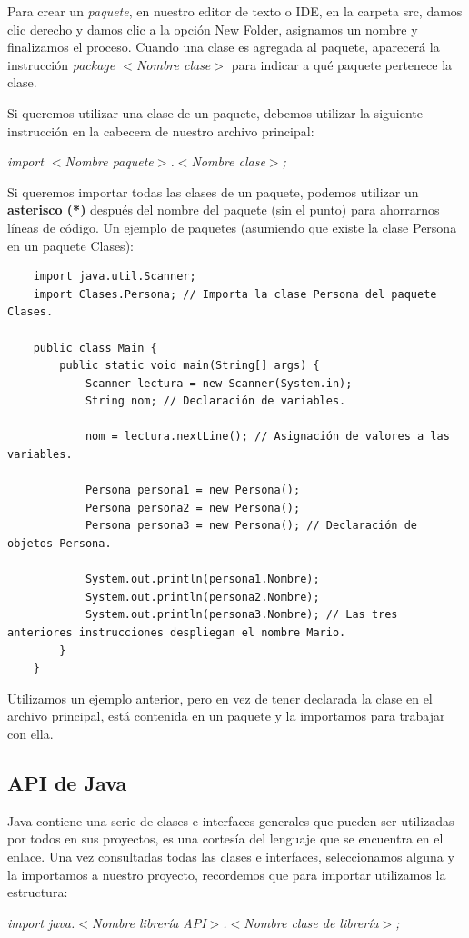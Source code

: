 Para crear un \textit{paquete}, en nuestro editor de texto o IDE, en la carpeta src, damos clic derecho y damos clic a la opción New Folder, asignamos un nombre y finalizamos el proceso. Cuando una clase es agregada al paquete, aparecerá la instrucción \textit{package $<$Nombre clase$>$} para indicar a qué paquete pertenece la clase.

Si queremos utilizar una clase de un paquete, debemos utilizar la siguiente instrucción en la cabecera de nuestro archivo principal:
\begin{center}
	\textit{import $<$Nombre paquete$>$.$<$Nombre clase$>$;}
\end{center}

Si queremos importar todas las clases de un paquete, podemos utilizar un \textbf{asterisco (*)} después del nombre del paquete (sin el punto) para ahorrarnos líneas de código. Un ejemplo de paquetes (asumiendo que existe la clase Persona en un paquete Clases):
\begin{lstlisting}
    import java.util.Scanner;
    import Clases.Persona; // Importa la clase Persona del paquete Clases.
    
    public class Main {
        public static void main(String[] args) {
            Scanner lectura = new Scanner(System.in);
            String nom; // Declaración de variables.
            
            nom = lectura.nextLine(); // Asignación de valores a las variables.
            
            Persona persona1 = new Persona();
            Persona persona2 = new Persona();
            Persona persona3 = new Persona(); // Declaración de objetos Persona.
            
            System.out.println(persona1.Nombre);
            System.out.println(persona2.Nombre);
            System.out.println(persona3.Nombre); // Las tres anteriores instrucciones despliegan el nombre Mario.
        }
    }
\end{lstlisting}

Utilizamos un ejemplo anterior, pero en vez de tener declarada la clase en el archivo principal, está contenida en un paquete y la importamos para trabajar con ella.


\subsection{API de Java}
\hspace{0.55cm}Java contiene una serie de clases e interfaces generales que pueden ser utilizadas por todos en sus proyectos, es una cortesía del lenguaje que se encuentra en el enlace. Una vez consultadas todas las clases e interfaces, seleccionamos alguna y la importamos a nuestro proyecto, recordemos que para importar utilizamos la estructura:
\begin{center}
	\textit{import java.$<$Nombre librería API$>$.$<$Nombre clase de librería$>$;}
\end{center}

